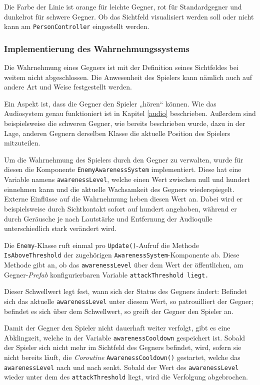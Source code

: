 Die Farbe der Linie ist orange für leichte Gegner, rot für Standardgegner und dunkelrot für schwere Gegner. Ob das Sichtfeld visualisiert werden soll oder nicht kann am \texttt{PersonController} eingestellt werden.

\subsubsection{Implementierung des Wahrnehmungssystems}
\label{sec:enemyImplementationAwareness}

Die Wahrnehmung eines Gegners ist mit der Definition seines Sichtfeldes bei weitem nicht abgeschlossen. Die Anwesenheit des Spielers kann nämlich auch auf andere Art und Weise festgestellt werden.

Ein Aspekt ist, dass die Gegner den Spieler 
„hören“ können. Wie das Audiosystem genau funktioniert ist in Kapitel \ref{audio} beschrieben. Außerdem sind beispielsweise die schweren Gegner, wie bereits beschrieben wurde, dazu in der Lage, anderen Gegnern derselben Klasse die aktuelle Position des Spielers mitzuteilen.

Um die Wahrnehmung des Spielers durch den Gegner zu verwalten, wurde für diesen die Komponente \texttt{EnemyAwarenessSystem} implementiert. Diese hat eine Variable namens \texttt{awarenessLevel}, welche einen Wert zwischen null und hundert einnehmen kann und die aktuelle Wachsamkeit des Gegners wiederspiegelt. Externe Einflüsse auf die Wahrnehmung heben diesen Wert an. Dabei wird er beispielsweise durch Sichtkontakt sofort auf hundert angehoben, während er durch Geräusche je nach Lautstärke und Entfernung der Audioqulle unterschiedlich stark verändert wird. 

Die \texttt{Enemy}-Klasse ruft einmal pro \texttt{Update()}-Aufruf die Methode \texttt{IsAboveThreshold} der zugehörigen \texttt{AwarenessSystem}-Komponente ab. Diese Methode gibt an, ob das \texttt{awarenessLevel} über dem Wert der öffentlichen, am Gegner-\textit{Prefab} konfigurierbaren Variable \texttt{attackThreshold liegt.}

Dieser Schwellwert legt fest, wann sich der Status des Gegners ändert: Befindet sich das aktuelle \texttt{awarenessLevel} unter diesem Wert, so patrouilliert der Gegner; befindet es sich über dem Schwellwert, so greift der Gegner den Spieler an.

Damit der Gegner den Spieler nicht dauerhaft weiter verfolgt, gibt es eine Abklingzeit, welche in der Variable \texttt{awarenessCooldown} gespeichert ist. Sobald der Spieler sich nicht mehr im Sichtfeld des Gegners befindet, wird, sofern sie nicht bereits läuft, die \textit{Coroutine} \texttt{AwarenessCooldown()} gestartet, welche das \texttt{awarenessLevel} nach und nach senkt. Sobald der Wert des \texttt{awareness\-Level} wieder unter dem des \texttt{attackThreshold} liegt, wird die Verfolgung abgebrochen.

